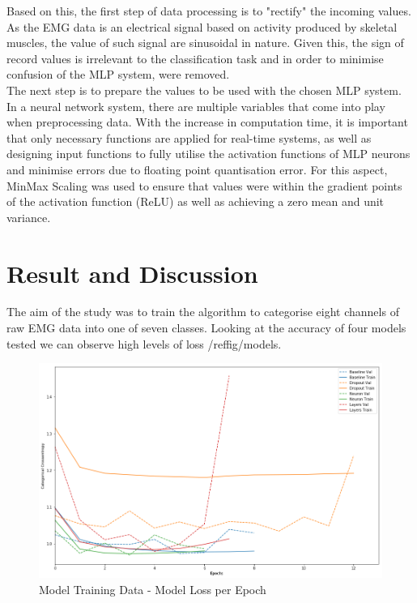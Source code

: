 \documentclass[11pt]{article}
\begin{document}
	\noindent
	Based on this, the first step of data processing is to "rectify" the incoming values. As the EMG data is an electrical signal based on activity produced by skeletal muscles, the value of such signal are sinusoidal in nature. Given this, the sign of record values is irrelevant to the classification task and in order to minimise confusion of the MLP system, were removed.\\
	
	\noindent
	The next step is to prepare the values to be used with the chosen MLP system. In a neural network system, there are multiple variables that come into play when preprocessing data. With the increase in computation time, it is important that only necessary functions are applied for real-time systems, as well as designing input functions to fully utilise the activation functions of MLP neurons and minimise errors due to floating point quantisation error. For this aspect, MinMax Scaling was used to ensure that values were within the gradient points of the activation function (ReLU) as well as achieving a zero mean and unit variance.
	
	\section{Result and Discussion}
	The aim of the study was to train the algorithm to categorise eight channels of raw EMG data into one of seven classes. Looking at the accuracy of four models tested we can observe high levels of loss /ref{fig/models}.
	
	\begin{figure}[H]
		\centering
		\includegraphics[width=15cm]{Figures/results}
		\caption{Model Training Data - Model Loss per Epoch}
		\label{fig:models}
	\end{figure}
	
\end{document}
